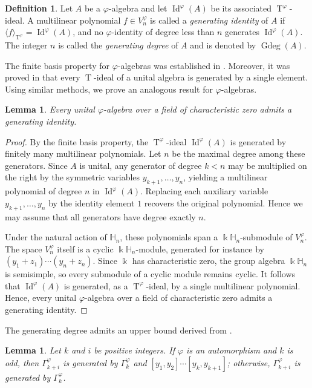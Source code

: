 \documentclass{amsart}
\newtheorem{lem}[thm]{Lemma}
\theoremstyle{definition}
\newtheorem{Def}[thm]{Definition}
\theoremstyle{remark}
\numberwithin{equation}{section}
\newcommand{\lr}[1]{\langle #1 \rangle}
\def \Ga{\Gamma}
\def \vp{\varphi}
\def \k{\Bbbk}
\def \H{\mathbb{H}}
\def \gd{\operatorname{Gdeg}}
\def \Id{\operatorname{Id}}
\def \T{\operatorname{T}}
\begin{document}
\begin{Def} \label{def3.1}
	Let $A$ be a $\vp$-algebra and let $\Id^\vp(A)$ be its associated $\T^\vp$-ideal. A multilinear polynomial $f \in V_n^\vp$ is called a \emph{generating identity} of $A$ if $\lr{f}_{\T^{\vp}} = \Id^{\vp}(A)$, and no $\vp$-identity of degree less than $n$ generates $\Id^{\vp}(A)$. The integer $n$ is called the \emph{generating degree} of $A$ and is denoted by $\gd(A)$.
\end{Def}	
	
	The finite basis property for $\vp$-algebras was established in \cite{AB,AGK,Sv11,Sv14}. Moreover, it was proved in \cite{BXYZZ} that every $\T$-ideal of a unital algebra is generated by a single element. Using similar methods, we prove an analogous result for $\vp$-algebras.
	
\begin{lem} \label{lem3.2}
	Every unital $\vp$-algebra over a field of characteristic zero admits a generating identity.
\end{lem}

\begin{proof}
	By the finite basis property, the $\T^{\vp}$-ideal $\Id^\vp(A)$ is generated by finitely many multilinear polynomials. Let $n$ be the maximal degree among these generators. Since $A$ is unital, any generator of degree $k < n$ may be multiplied on the right by the symmetric variables $y_{k+1}, \dots, y_n$, yielding a multilinear polynomial of degree $n$ in $\Id^\vp(A)$. Replacing each auxiliary variable $y_{k+1},\dots,y_n$ by the identity element $1$ recovers the original polynomial. Hence we may assume that all generators have degree exactly $n$.
	
	Under the natural action of $\H_n$, these polynomials span a $\k\H_n$-submodule of $V_n^{\vp}$. The space $V_n^\vp$ itself is a cyclic $\k\H_n$-module, generated for instance by $(y_1+z_1)\cdots(y_n+z_n)$. Since $\k$ has characteristic zero, the group algebra $\k\H_n$ is semisimple, so every submodule of a cyclic module remains cyclic. It follows that $\Id^\vp(A)$ is generated, as a $\T^\vp$-ideal, by a single multilinear polynomial. Hence, every unital $\vp$-algebra over a field of characteristic zero admits a generating identity.
\end{proof}

	The generating degree admits an upper bound derived from \cite{Ma09,MMM}.
	
\begin{lem}\label{lem3.3}\cite{Ma09,MMM}
	Let $k$ and $i$ be positive integers. If $\vp$ is an automorphism and $k$ is odd, then $\Ga_{k+i}^\vp$ is generated by $\Ga_k^\vp$ and $[y_1,y_2]\cdots[y_k,y_{k+1}]$; otherwise, $\Ga_{k+i}^\vp$ is generated by $\Ga_k^\vp$.
\end{lem}
\end{document}
